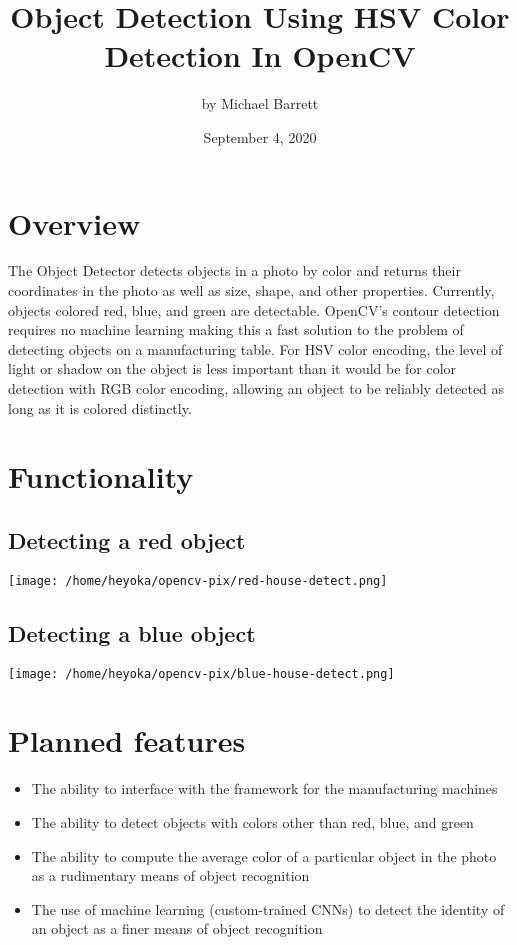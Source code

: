 \documentclass[11pt]{article}
\author{by Michael Barrett}
\date{September 4, 2020}
\title{Object Detection Using HSV Color Detection In OpenCV}
\begin{document}
\maketitle

\section{Overview}
\label{sec:org2923cbe}
The Object Detector detects objects in a photo by color and returns their coordinates in the photo as well as size, shape, and other properties. Currently, objects colored red, blue, and green are detectable. OpenCV's contour detection requires no machine learning making this a fast solution to the problem of detecting objects on a manufacturing table. For HSV color encoding, the level of light or shadow on the object is less important than it would be for color detection with RGB color encoding, allowing an object to be reliably detected as long as it is colored distinctly.
\section{Functionality}
\label{sec:orgd7c4eaf}
\subsection{Detecting a red object}
\label{sec:org274af1d}
\begin{center}
\texttt{[image: /home/heyoka/opencv-pix/red-house-detect.png]}
\end{center}
\subsection{Detecting a blue object}
\label{sec:org2ce527c}
\begin{center}
\texttt{[image: /home/heyoka/opencv-pix/blue-house-detect.png]}
\end{center}
\section{Planned features}
\label{sec:org7cb4f04}
\begin{itemize}
\item The ability to interface with the framework for the manufacturing machines
\item The ability to detect objects with colors other than red, blue, and green
\item The ability to compute the average color of a particular object in the photo as a rudimentary means of object recognition
\item The use of machine learning (custom-trained CNNs) to detect the identity of an object as a finer means of object recognition
\end{itemize}
\end{document}
